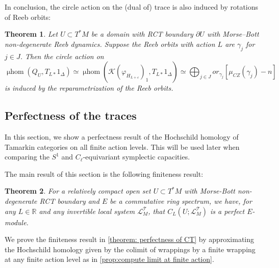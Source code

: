 \documentclass[11pt]{amsart}
\numberwithin{equation}{section}
\theoremstyle{plain}
\newtheorem{Thm}{Theorem}[section]
\theoremstyle{definition}
\theoremstyle{remark}
\newcommand{\bR} { {\mathbb{R}}}
\newcommand{\cK} { {\mathcal{K}}}
\newcommand{\sT} { {\mathscr{T}}}
\newcommand\mhom{\operatorname{\mu hom}}
\begin{document}
In conclusion, the circle action on the (dual of) trace is also induced by rotations of Reeb orbits:

\begin{Thm}\label{cor: mhom circle action trace}
Let $U \subset T^*M$ be a domain with RCT boundary $\partial U$ with Morse--Bott non-degenerate Reeb dynamics. 
Suppose the Reeb orbits with action $L$ are $\gamma_j$ for $j \in J$. Then the circle action on
\[\mhom(Q_U, T_{L*}1_\Delta) \simeq \mhom(\cK(\varphi_{H_{L+\varepsilon}})_1, T_{L*}1_\Delta) \simeq \bigoplus_{j\in J}or_{\gamma_j}[\mu_{CZ}(\gamma_j)-n]\]
is induced by the reparametrization of the Reeb orbits.
\end{Thm}


\subsection{Perfectness of the traces}
In this section, we show a perfectness result of the Hochschild homology of Tamarkin categories on all finite action levels. This will be used later when comparing the $S^1$ and $C_\ell$-equivariant symplectic capacities. 


The main result of this section is the following finiteness result:
\begin{Thm}\label{theorem: perfectness of CT}For a relatively compact open set $U\subset T^*M$ with Morse-Bott non-degenerate RCT boundary and $E$ be a commutative ring spectrum, we have, for any $L\in \bR$ and any invertible local system $\mathscr{L}_M^\sT$, that $C_L(U; \mathscr{L}_M^\sT)$ 
is a perfect $E$-module.
\end{Thm}













We prove the finiteness result in \autoref{theorem: perfectness of CT} by approximating the Hochschild homology given by the colimit of wrappings by a finite wrapping at any finite action level as in \autoref{prop:compute limit at finite action}. 
\end{document}
